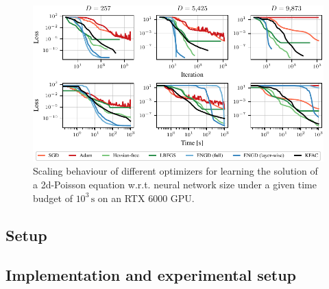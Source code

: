 \begin{figure}[tb]
  \centering
  \includegraphics{../kfac_pinns_exp/exp17_groupplot_poisson2d/loss.pdf}
  \caption{Scaling behaviour of different optimizers for learning the solution of a 2d-Poisson equation w.r.t.
    neural network size under a given time budget of $10^3\,\text{s}$ on an RTX 6000 GPU.}
  \label{fig:pedagogical-example}
\end{figure}

\subsection{Setup}
\subsection{Implementation and experimental setup}

